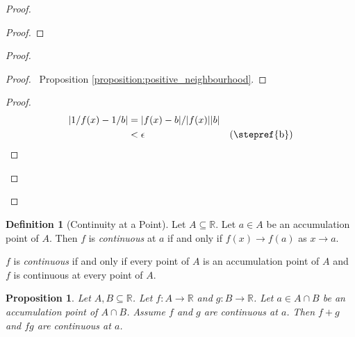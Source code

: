 \documentclass{article}
\let\qed\relax
\newtheorem{proposition}[axiom]{Proposition}
\theoremstyle{definition}
\newtheorem{definition}[axiom]{Definition}
\begin{document}
\begin{proof}
    \pf
    \begin{proof}
    \end{proof}
    \begin{proof}
        \begin{proof}
            \pf\ Proposition \ref{proposition:positive_neighbourhood}.
        \end{proof}
        \begin{proof}
            \pf
            \begin{align*}
                |1/f(x) - 1/b| & = |f(x) - b|/|f(x)||b| \\
                & < \epsilon & (\text{\stepref{b}})
            \end{align*}
        \end{proof}
    \end{proof}
    \qed
\end{proof}

\begin{definition}[Continuity at a Point]
    Let $A \subseteq \mathbb{R}$. Let $a \in A$ be an accumulation point of $A$. Then $f$ is \emph{continuous} at $a$ if and only if
    $f(x) \rightarrow f(a)$ as $x \rightarrow a$.

    $f$ is \emph{continuous} if and only if every point of $A$ is an accumulation point of $A$ and $f$ is continuous at every point of
    $A$.
\end{definition}

\begin{proposition}
    Let $A, B \subseteq \mathbb{R}$. Let $f : A \rightarrow \mathbb{R}$ and $g : B \rightarrow \mathbb{R}$. Let $a \in A \cap B$
    be an accumulation point of $A \cap B$. Assume $f$ and $g$ are continuous at $a$. Then $f + g$ and $fg$ are continuous at $a$.
\end{proposition}
\end{document}
